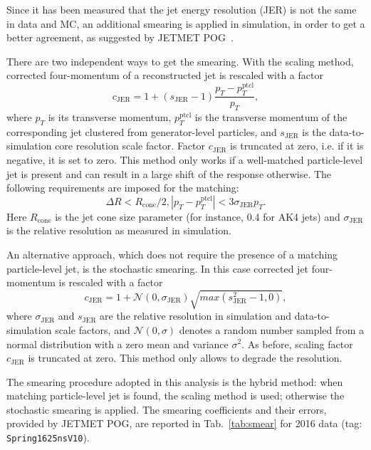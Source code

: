 Since it has been measured that the jet energy resolution (JER) is not the same in data and MC, an additional smearing is applied in simulation, in order to get a better agreement, as suggested by JETMET POG~\cite{bib:jetsmear}.

There are two independent ways to get the smearing. With the scaling method, corrected four-momentum of a reconstructed jet is rescaled with a factor
$$c_{\text{JER}} = 1 + (s_{\text{JER}} - 1) \frac{p_T - p_T^{\text{ptcl}}}{p_T},$$
where $p_T$ is its transverse momentum, $p_T^{\text{ptcl}}$ is the transverse momentum of the corresponding jet clustered from generator-level particles, and $s_{\text{JER}}$ is the data-to-simulation core resolution scale factor. Factor $c_{\text{JER}}$ is truncated at zero, i.e. if it is negative, it is set to zero.
This method only works if a well-matched particle-level jet is present and can result in a large shift of the response otherwise. The following requirements are imposed for the matching:
$$\Delta R < R_{\text{cone}} / 2, |p_T - p_T^{\text{ptcl}}| < 3 \sigma_{\text{JER}} p_{T}.$$
Here $R_{\text{cone}}$ is the jet cone size parameter (for instance, 0.4 for AK4 jets) and $\sigma_{\text{JER}}$ is the relative \pt resolution as measured in simulation.

An alternative approach, which does not require the presence of a matching particle-level jet, is the stochastic smearing. In this case corrected jet four-momentum is rescaled with a factor $$c_{\text{JER}} = 1 + \mathcal{N}(0, \sigma_{\text{JER}}) \sqrt{max(s_{\text{JER}}^2 - 1, 0)},$$ where $\sigma_{\text{JER}}$ and $s_{\text{JER}}$ are the relative \pt resolution in simulation and data-to-simulation scale factors, and $\mathcal{N}(0, \sigma)$ denotes a random number sampled from a normal distribution with a zero mean and variance $\sigma^2$. As before, scaling factor $c_{\text{JER}}$ is truncated at zero. This method only allows to degrade the resolution.

The smearing procedure adopted in this analysis is the hybrid method: when matching particle-level jet is found, the scaling method is used; otherwise the stochastic smearing is applied. The smearing coefficients and their errors, provided by JETMET POG, are reported in Tab.~\ref{tab:smear} for 2016 data (tag: {\tt Spring1625nsV10}).


